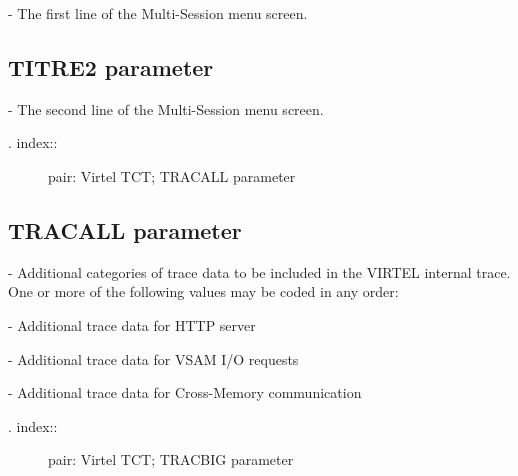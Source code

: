 \documentclass[letterpaper,10pt,english]{sphinxmanual}
\begin{document}
 - The first line of the Multi-Session menu screen.


\subsection{TITRE2 parameter}
\label{\detokenize{Installation_Guide:titre2-parameter}}
\begin{sphinxVerbatim}[commandchars=\\\{\}]
 
\end{sphinxVerbatim}

 - The second line of the Multi-Session menu screen.
\begin{description}
\item[{. index::}] \leavevmode
pair: Virtel TCT; TRACALL parameter

\end{description}


\subsection{TRACALL parameter}
\label{\detokenize{Installation_Guide:tracall-parameter}}
\begin{sphinxVerbatim}[commandchars=\\\{\}]
 
\end{sphinxVerbatim}

 - Additional categories of trace data to be included in the VIRTEL internal trace. One or more of the following values may be coded in any order:

 - Additional trace data for HTTP server

 - Additional trace data for VSAM I/O requests

 - Additional trace data for Cross-Memory communication
\begin{description}
\item[{. index::}] \leavevmode
pair: Virtel TCT; TRACBIG parameter

\end{description}
\end{document}
